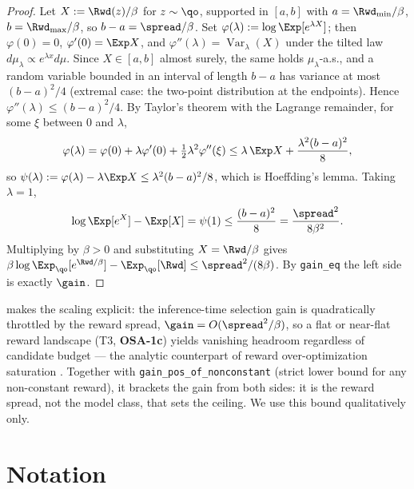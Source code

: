 \begin{proof}
Let $X:=\Rwd(z)/\beta$ for $z\sim\qo$, supported in $[a,b]$ with $a=\Rwd_{\min}/\beta$,
$b=\Rwd_{\max}/\beta$, so $b-a=\spread/\beta$. Set $\varphi(\lambda):=\log\Exp[e^{\lambda X}]$; then
$\varphi(0)=0$, $\varphi'(0)=\Exp X$, and $\varphi''(\lambda)=\operatorname{Var}_{\lambda}(X)$ under
the tilted law $d\mu_\lambda\propto e^{\lambda x}d\mu$. Since $X\in[a,b]$ almost surely, the same
holds $\mu_\lambda$-a.s., and a random variable bounded in an interval of length $b-a$ has variance at
most $(b-a)^2/4$ (extremal case: the two-point distribution at the endpoints). Hence
$\varphi''(\lambda)\le (b-a)^2/4$. By Taylor's theorem with the Lagrange remainder, for some $\xi$
between $0$ and $\lambda$,
\[
\varphi(\lambda)=\varphi(0)+\lambda\varphi'(0)+\tfrac12\lambda^2\varphi''(\xi)\le \lambda\,\Exp X+\frac{\lambda^2 (b-a)^2}{8},
\]
so $\psi(\lambda):=\varphi(\lambda)-\lambda\Exp X\le \lambda^2(b-a)^2/8$, which is Hoeffding's lemma.
Taking $\lambda=1$,
\[
\log\Exp[e^{X}]-\Exp[X]=\psi(1)\le \frac{(b-a)^2}{8}=\frac{\spread^2}{8\beta^2}.
\]
Multiplying by $\beta>0$ and substituting $X=\Rwd/\beta$ gives
$\beta\log\Exp_{\qo}[e^{\Rwd/\beta}]-\Exp_{\qo}[\Rwd]\le \spread^2/(8\beta)$. By \texttt{gain\_eq} the
left side is exactly $\gain$.
\end{proof}

 makes the scaling explicit: the inference-time selection gain is quadratically
throttled by the reward spread, $\gain=O(\spread^2/\beta)$, so a flat or near-flat reward landscape
(T3, \textbf{OSA-1c}) yields vanishing headroom regardless of candidate budget --- the analytic
counterpart of reward over-optimization saturation \citep{gao2023overopt}. Together with
\texttt{gain\_pos\_of\_nonconstant} (strict lower bound for any non-constant reward), it brackets the
gain from both sides: it is the reward spread, not the model class, that sets the ceiling. We use this
bound qualitatively only.

\section{Notation}
\label{app:notation}

